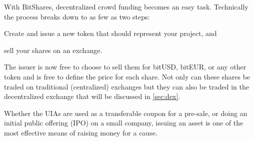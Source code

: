 With BitShares, decentralized crowd funding becomes an easy task. Technically
the process breaks down to as few as two steps:
\begin{inparaenum}[(a)]
 \item Create and issue a new token that should represent your project, and 
 \item sell your shares on an exchange.
\end{inparaenum}
The issuer is now free to choose to sell them for bitUSD, bitEUR, or any other
token and is free to define the price for each share. Not only can these shares
be traded on traditional (centralized) exchanges but they can also be traded in
the decentralized exchange that will be discussed in \cref{sec:dex}.

Whether the UIAs are used as a transferable coupon for a pre-sale, or doing an
initial public offering (IPO) on a small company, issuing an asset is one of
the most effective means of raising money for a cause.
